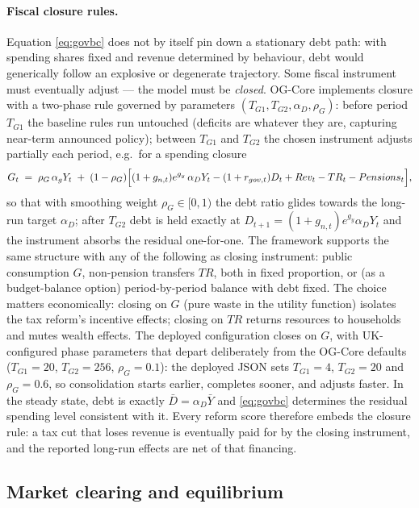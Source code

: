 \paragraph{Fiscal closure rules.} Equation \eqref{eq:govbc} does not by itself pin down a stationary debt path: with spending shares fixed and revenue determined by behaviour, debt would generically follow an explosive or degenerate trajectory. Some fiscal instrument must eventually adjust --- the model must be \emph{closed}. OG-Core implements closure with a two-phase rule governed by parameters $(T_{G1}, T_{G2}, \alpha_D, \rho_G)$: before period $T_{G1}$ the baseline rules run untouched (deficits are whatever they are, capturing near-term announced policy); between $T_{G1}$ and $T_{G2}$ the chosen instrument adjusts partially each period, e.g.\ for a spending closure
\begin{equation}
\label{eq:closure}
G_t \;=\; \rho_G\,\alpha_g Y_t \;+\; (1-\rho_G)\Bigl[(1+g_{n,t})e^{g_y}\,\alpha_D Y_t - (1+r_{gov,t})D_t + Rev_t - TR_t - Pensions_t\Bigr],
\end{equation}
so that with smoothing weight $\rho_G\in[0,1)$ the debt ratio glides towards the long-run target $\alpha_D$; after $T_{G2}$ debt is held exactly at $D_{t+1} = (1+g_{n,t})e^{g_y}\alpha_D Y_t$ and the instrument absorbs the residual one-for-one. The framework supports the same structure with any of the following as closing instrument: public consumption $G$, non-pension transfers $TR$, both in fixed proportion, or (as a budget-balance option) period-by-period balance with debt fixed. The choice matters economically: closing on $G$ (pure waste in the utility function) isolates the tax reform's incentive effects; closing on $TR$ returns resources to households and mutes wealth effects. The deployed configuration closes on $G$, with UK-configured phase parameters that depart deliberately from the OG-Core defaults ($T_{G1}=20$, $T_{G2}=256$, $\rho_G=0.1$): the deployed JSON sets $T_{G1}=4$, $T_{G2}=20$ and $\rho_G=0.6$, so consolidation starts earlier, completes sooner, and adjusts faster. In the steady state, debt is exactly $\bar{D} = \alpha_D \bar{Y}$ and \eqref{eq:govbc} determines the residual spending level consistent with it. Every reform score therefore embeds the closure rule: a tax cut that loses revenue is eventually paid for by the closing instrument, and the reported long-run effects are net of that financing.

\subsection{Market clearing and equilibrium}
\label{subsec:clearing}

